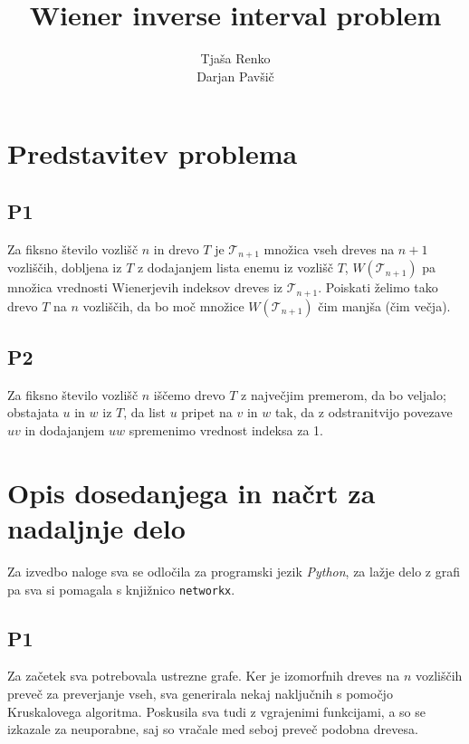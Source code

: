\documentclass[a4paper, 12 pt]{article}
\title{Wiener inverse interval problem}
\author{Tjaša Renko \\ Darjan Pavšič}
\begin{document}
\maketitle

\section{Predstavitev problema}

\subsection{P1}

Za fiksno število vozlišč $n$ in drevo $T$ je $\mathscr{T}_{n+1}$ množica vseh dreves na $n+1$ vozliščih, dobljena iz $T$ z dodajanjem lista enemu iz vozlišč $T$, $W(\mathscr{T}_{n+1})$ pa množica vrednosti Wienerjevih indeksov dreves iz $\mathscr{T}_{n+1}$. Poiskati želimo tako drevo $T$ na $n$ vozliščih, da bo moč množice $W(\mathscr{T}_{n+1})$ čim manjša (čim večja).


\subsection{P2}

Za fiksno število vozlišč $n$ iščemo drevo $T$ z največjim premerom, da bo veljalo; obstajata $u$ in $w$ iz $T$, da list $u$ pripet na $v$ in $w$ tak, da z odstranitvijo povezave $uv$ in dodajanjem $uw$ spremenimo vrednost indeksa za 1.

\section{Opis dosedanjega in načrt za nadaljnje delo}

Za izvedbo naloge sva se odločila za programski jezik \textit{Python}, za lažje delo z grafi pa sva si pomagala s knjižnico \texttt{networkx}.

\subsection{P1}

Za začetek sva potrebovala ustrezne grafe. Ker je izomorfnih dreves na $n$ vozliščih preveč za preverjanje vseh, sva generirala nekaj naključnih s pomočjo Kruskalovega algoritma. Poskusila sva tudi z vgrajenimi funkcijami, a so se izkazale za neuporabne, saj so vračale med seboj preveč podobna drevesa. \newline
\end{document}
